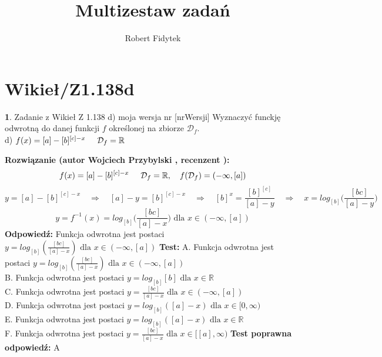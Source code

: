 \documentclass[12pt, a4paper]{article}
\title{Multizestaw zadań}
\author{Robert Fidytek}
\date{}
\theoremstyle{definition} %
\newtheorem{zad}{}
\newcommand{\kategoria}[1]{\section{#1}} %
\newcommand{\zadStart}[1]{\begin{zad}#1\newline} %
\newcommand{\zadStop}{\end{zad}}   %
\newcommand{\rozwStart}[2]{\noindent \textbf{Rozwiązanie (autor #1 , recenzent #2): }\newline} %
\newcommand{\rozwStop}{\newline}                                            %
\newcommand{\odpStart}{\noindent \textbf{Odpowiedź:}\newline}    %
\newcommand{\odpStop}{\newline}                                             %
\newcommand{\testStart}{\noindent \textbf{Test:}\newline} %
\newcommand{\testStop}{\newline} %
\newcommand{\kluczStart}{\noindent \textbf{Test poprawna odpowiedź:}\newline} %
\newcommand{\kluczStop}{\newline} %
\begin{document}
\maketitle


\kategoria{Wikieł/Z1.138d}
\zadStart{Zadanie z Wikieł Z 1.138 d) moja wersja nr [nrWersji]}
Wyznaczyć funckję odwrotną do danej funkcji $f$ określonej na zbiorze $\mathcal{D}_{f}$.\\
d) $f(x)=[a]-[b]^{[c]-x}\hspace{5mm}\mathcal{D}_{f}=\mathbb{R}$
\zadStop
\rozwStart{Wojciech Przybylski}{}
$$f(x)=[a]-[b]^{[c]-x}\hspace{5mm} \mathcal{D}_{f}=\mathbb{R}, \quad f(\mathcal{D}_{f})=(-\infty,[a])$$
$$y=[a]-[b]^{[c]-x} \quad \Rightarrow \quad [a]-y=[b]^{[c]-x} \quad \Rightarrow \quad [b]^{x}=\frac{[b]^{[c]}}{[a]-y} \quad \Rightarrow \quad x=log_{[b]}\Big(\frac{[bc]}{[a]-y}\Big)$$
$$y=f^{-1}(x)=log_{[b]}\Big(\frac{[bc]}{[a]-x}\Big) \mbox{ dla } x\in (-\infty,[a])$$
\rozwStop
\odpStart
Funkcja odwrotna jest postaci $y=log_{[b]}(\frac{[bc]}{[a]-x}) \mbox{ dla }x\in (-\infty,[a])$
\odpStop
\testStart
A. Funkcja odwrotna jest postaci $y=log_{[b]}(\frac{[bc]}{[a]-x})  \mbox{ dla }x\in(-\infty,[a])$\\
B. Funkcja odwrotna jest postaci $y=log_{[b]}{[b]} \mbox{ dla }x\in\mathbb{R}$\\
C. Funkcja odwrotna jest postaci $y=\frac{[bc]}{[a]-x}  \mbox{ dla }x\in(-\infty,[a])$\\
D. Funkcja odwrotna jest postaci $y=log_{[b]}([a]-x)  \mbox{ dla }x\in[0,\infty)$\\
E. Funkcja odwrotna jest postaci $y=log_{[b]}([a]-x) \mbox{ dla }x\in \mathbb{R}$\\
F. Funkcja odwrotna jest postaci $y=\frac{[bc]}{[a]-x}\mbox{ dla }x\in[[a],\infty)$
\testStop
\kluczStart
A
\kluczStop
\end{document}
